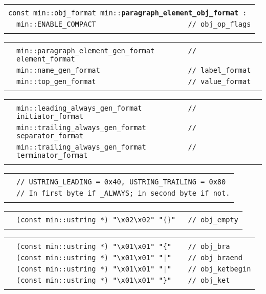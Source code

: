 \documentclass[12pt]{article}
\makeatletter
\newcommand{\TT}[1]{{\tt \bfseries #1}}
\newenvironment{indpar}[1][0.3in]%
	{\begin{list}{}%
		     {\setlength{\itemsep}{0in}%
		      \setlength{\topsep}{0in}%
		      \setlength{\parsep}{1ex}%
		      \setlength{\labelwidth}{#1}%
		      \setlength{\leftmargin}{#1}%
		      \addtolength{\leftmargin}{\labelsep}}%
	 \item}%
	{\end{list}}
\newcommand{\LABEL}[1]{\label{#1}}
\newlength{\ARGBREAKLENGTH}
\newcommand{\ARGBREAK}[1][\ARGBREAKLENGTH]{\\&\hspace*{#1}}
\newcommand{\MINLKEY}[2]%
           {\TT{#1#2}\index{min::#1@{\tt min::#1}!#2@{\tt #2}}%
                     \index{#1@{\tt #1}!#2@{\tt #2}}}
\makeatother
\begin{document}
\begin{indpar}[1em]
\begin{tabular}{r@{}l}\hspace*{0.1in} \\[-3ex]
\multicolumn{2}{l}{\tt const min::obj\_format
                   min::\MINLKEY{paragraph\_element}{\_obj\_format}:}%
\LABEL{MIN::PARAGRAPH_ELEMENT_OBJ_FORMAT}\ARGBREAK
\verb|min::ENABLE_COMPACT                      // obj_op_flags|\ARGBREAK
\end{tabular}

\vspace{-4ex}\begin{tabular}{r@{}l}\hspace*{0.1in}\ARGBREAK
\verb|min::paragraph_element_gen_format        // element_format|\ARGBREAK
\verb|min::name_gen_format                     // label_format|\ARGBREAK
\verb|min::top_gen_format                      // value_format|\ARGBREAK
\end{tabular}

\vspace{-4ex}\begin{tabular}{r@{}l}\hspace*{0.1in}\ARGBREAK
\verb|min::leading_always_gen_format           // initiator_format|\ARGBREAK
\verb|min::trailing_always_gen_format          // separator_format|\ARGBREAK
\verb|min::trailing_always_gen_format          // terminator_format|\ARGBREAK
\end{tabular}

\vspace{-4ex}\begin{tabular}{r@{}l}\hspace*{0.1in}\ARGBREAK
\verb|// USTRING_LEADING = 0x40, USTRING_TRAILING = 0x80|\ARGBREAK
\verb|// In first byte if _ALWAYS; in second byte if not.|\ARGBREAK
\end{tabular}

\vspace{-4ex}\begin{tabular}{r@{}l}\hspace*{0.1in}\ARGBREAK
\verb|(const min::ustring *) "\x02\x02" "{}"   // obj_empty|\ARGBREAK
\end{tabular}

\vspace{-4ex}\begin{tabular}{r@{}l}\hspace*{0.1in}\ARGBREAK
\verb|(const min::ustring *) "\x01\x01" "{"    // obj_bra|\ARGBREAK
\verb$(const min::ustring *) "\x01\x01" "|"    // obj_braend$\ARGBREAK
\verb$(const min::ustring *) "\x01\x01" "|"    // obj_ketbegin$\ARGBREAK
\verb|(const min::ustring *) "\x01\x01" "}"    // obj_ket|\ARGBREAK
\end{tabular}


\end{indpar}
\end{document}
